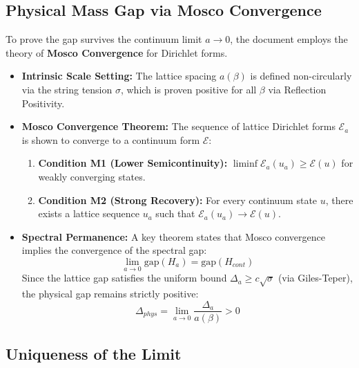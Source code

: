 \subsection{Physical Mass Gap via Mosco Convergence}
\label{sec:mosco-convergence}

To prove the gap survives the continuum limit $a \to 0$, the document employs the theory of \textbf{Mosco Convergence} for Dirichlet forms.

\begin{itemize}
    \item \textbf{Intrinsic Scale Setting:} The lattice spacing $a(\beta)$ is defined non-circularly via the string tension $\sigma$, which is proven positive for all $\beta$ via Reflection Positivity.

    \item \textbf{Mosco Convergence Theorem:} The sequence of lattice Dirichlet forms $\mathcal{E}_a$ is shown to converge to a continuum form $\mathcal{E}$:
    \begin{enumerate}
        \item \textbf{Condition M1 (Lower Semicontinuity):} $\liminf \mathcal{E}_a(u_a) \geq \mathcal{E}(u)$ for weakly converging states.
        \item \textbf{Condition M2 (Strong Recovery):} For every continuum state $u$, there exists a lattice sequence $u_a$ such that $\mathcal{E}_a(u_a) \to \mathcal{E}(u)$.
    \end{enumerate}

    \item \textbf{Spectral Permanence:} A key theorem states that Mosco convergence implies the convergence of the spectral gap:
    \begin{equation}
    \lim_{a \to 0} \text{gap}(H_a) = \text{gap}(H_{cont})
    \end{equation}
    Since the lattice gap satisfies the uniform bound $\Delta_a \geq c \sqrt{\sigma}$ (via Giles-Teper), the physical gap remains strictly positive:
    \begin{equation}
    \Delta_{phys} = \lim_{a \to 0} \frac{\Delta_a}{a(\beta)} > 0
    \end{equation}
\end{itemize}

\subsection{Uniqueness of the Limit}
\label{sec:uniqueness-limit}

